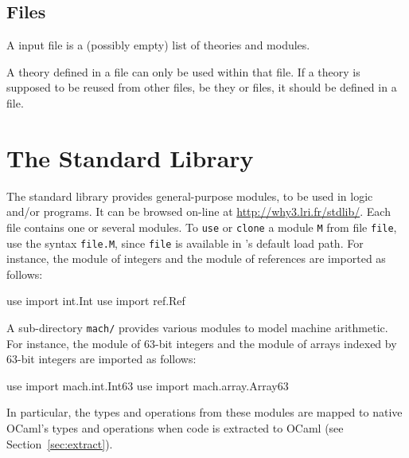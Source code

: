 \subsection{Files}

A \whyml input file is a (possibly empty) list of theories and modules.
\begin{center}\framebox{}\end{center}
A theory defined in a \whyml file can only be used within that
file. If a theory is supposed to be reused from other files, be they
\why or \whyml files, it should be defined in a \why file.


\section{The \why Standard Library}
\label{sec:library}

The \why standard library provides general-purpose
modules, to be used in logic and/or programs.
It can be browsed on-line at \url{http://why3.lri.fr/stdlib/}.
Each file contains one or several modules.
To \texttt{use} or \texttt{clone} a module \texttt{M} from file
\texttt{file}, use the syntax \texttt{file.M}, since \texttt{file} is
available in \why's default load path. For instance, the module of
integers and the module of references are imported as follows:
\begin{whycode}
  use import int.Int
  use import ref.Ref
\end{whycode}
A sub-directory \texttt{mach/} provides various modules to model
machine arithmetic.
For instance, the module of 63-bit integers and the module of arrays
indexed by 63-bit integers are imported as follows:
\begin{whycode}
  use import mach.int.Int63
  use import mach.array.Array63
\end{whycode}
In particular, the types and operations from these modules are mapped
to native OCaml's types and operations when \why code is extracted to
OCaml (see Section~\ref{sec:extract}).

